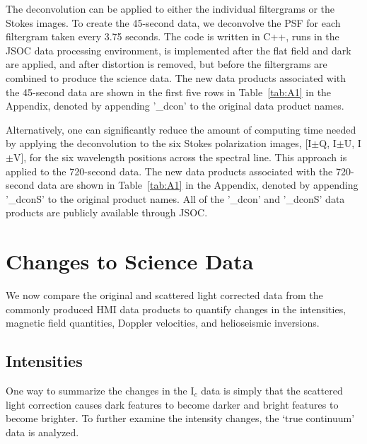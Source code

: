 \documentclass[trackchanges]{aastex62}
\begin{document}
The deconvolution can be applied to either the individual filtergrams or the Stokes images.  
To create the 45-second data, we deconvolve the PSF for each filtergram taken every 3.75 seconds.  The code is written in C++, runs in the JSOC data processing environment, is implemented after the flat field and dark are applied, and after distortion is removed, but before the filtergrams are combined to produce the science data.  The new data products associated with the 45-second data are shown in the first five rows in Table~\ref{tab:A1} in the Appendix, denoted by appending '\_dcon' to the original data product names. 

Alternatively, one can significantly reduce the amount of computing time needed by applying the deconvolution to the six Stokes polarization images, [I$\pm$Q, I$\pm$U, I$\pm$V], for the six wavelength positions across the spectral line. This approach is applied to the 720-second data. The new data products associated with the 720-second data are shown in Table~\ref{tab:A1} in the Appendix, denoted by appending '\_dconS' to the original product names. All of the '\_dcon' and '\_dconS' data products are publicly available through JSOC.    

\section{Changes to Science Data}\label{ref:sec4}
We now compare the original and scattered light corrected data from the commonly produced HMI data products to quantify changes in the intensities, magnetic field quantities, Doppler velocities, and helioseismic inversions. 

\subsection{Intensities}

One way to summarize the changes in the I$_c$ data is simply that the scattered light correction causes dark features to become darker and bright features to become brighter.  To further examine the intensity changes, the `true continuum' data is analyzed. 
\end{document}
